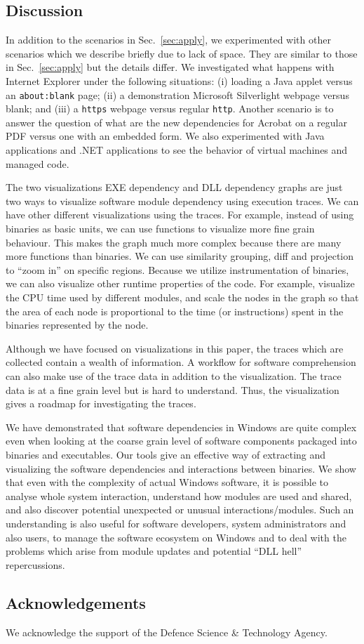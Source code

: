 \subsection{Discussion}

In addition to the scenarios in Sec.~\ref{sec:apply},
we experimented with other scenarios which we describe briefly due to lack
of space. They are similar to those in Sec.~\ref{sec:apply} but the details differ.
We investigated what happens with Internet Explorer under 
the following situations:
(i) loading a Java applet versus an {\tt about:blank} page; 
(ii) a demonstration Microsoft Silverlight webpage versus blank; and
(iii) a {\tt https} webpage versus regular {\tt http}.
Another scenario is to answer the question of
what are the new dependencies for Acrobat on a regular PDF versus
one with an embedded form.
We also experimented with Java applications and .NET applications 
to see the behavior of virtual machines and managed code.

The two visualizations EXE dependency and DLL dependency graphs are just two
ways to visualize software module dependency using execution traces.
We can have other different visualizations using the traces.
For example, instead of using binaries as basic units, we can use functions
to visualize more fine grain behaviour.
This makes the graph much more complex because there are many more functions
than binaries.
We can use similarity grouping, diff and projection to ``zoom in'' 
on specific regions.
Because we utilize instrumentation of binaries, we can also visualize other runtime
properties of the code.
For example, visualize the CPU time used by different modules,
and scale the nodes in the graph so that the area of each node is proportional to the time
(or instructions) spent in the binaries represented by the node.

Although we have focused on visualizations in this paper, the traces which are collected
contain a wealth of information. A workflow for software comprehension can also make use
of the trace data in addition to the visualization. 
The trace data is at a fine grain level but is hard to understand. 
Thus, the visualization gives a roadmap for investigating the traces.

We have demonstrated that software dependencies in Windows are quite
complex even when looking at the coarse grain level of software components 
packaged into binaries and executables.
Our tools give an effective way of extracting and
visualizing the software dependencies and interactions between binaries.
We show that even with the complexity of actual Windows software,
it is possible to analyse whole system interaction, 
understand how modules are used and shared,
and also discover potential unexpected or unusual interactions/modules.
Such an understanding is also useful for software developers,
system administrators and also users, to manage the 
software ecosystem on Windows and to deal with the problems which arise 
from module updates and potential ``DLL hell'' repercussions.

\subsection{Acknowledgements}

We acknowledge the support of the Defence Science \& Technology Agency.

